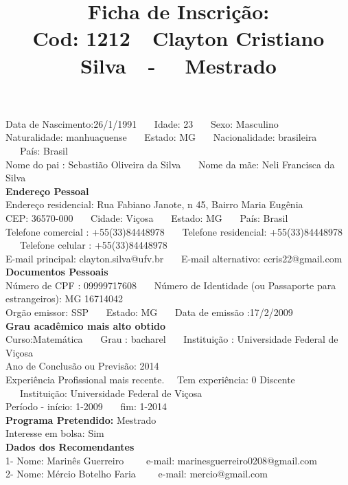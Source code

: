 \documentclass[11pt]{article}
\title{\vspace*{-4cm} Ficha de Inscrição: \\Cod: 1212\ \ Clayton Cristiano Silva\ \ - \ \ Mestrado 
 }
\date{}
\begin{document}
\maketitle
\vspace*{-1.5cm}
\noindent Data de Nascimento:26/1/1991
\ \ \ Idade: 23   \ \ \ Sexo: Masculino
\\
Naturalidade: manhuaçuense  
\ \ \  Estado: MG
\ \ \  Nacionalidade: brasileira
\ \ \ País: Brasil
\\        
Nome do pai : Sebastião Oliveira da Silva
\ \ \ Nome da mãe: Neli Francisca da Silva          
\\[0.2cm]                     
\textbf{Endereço Pessoal} 
\\ 
\noindent Endereço residencial: Rua Fabiano Janote, n 45, Bairro Maria Eugênia
\\
        CEP: 36570-000 
\ \ \ Cidade: Viçosa 
\ \ \ Estado: MG 
\ \ \ País: Brasil
\\		
		Telefone comercial : +55(33)84448978
\ \ \ Telefone residencial: +55(33)84448978
\ \ \ Telefone celular : +55(33)84448978
\\
E-mail principal: clayton.silva@ufv.br
\ \ \ E-mail alternativo: ccris22@gmail.com 
\\[0.2cm] 
\textbf{Documentos Pessoais}
\\
\noindent Número de CPF : 09999717608
\ \ \ Número de Identidade (ou Passaporte para estrangeiros): MG 16714042
\\
Orgão emissor: SSP
\ \ \ Estado: MG
\ \ \ Data de emissão :17/2/2009
\\[0.3cm]
\textbf{Grau acadêmico mais alto obtido}
\\	
Curso:Matemática
\ \ \ Grau : bacharel
\ \ \ Instituição : Universidade Federal de Viçosa
\\			
Ano de Conclusão ou Previsão: 2014
\\ 
Experiência Profissional mais recente. \ \  
Tem experiência: 0 Discente  
\ \ \ Instituição: Universidade Federal de Viçosa
\\  
Período - início: 1-2009
\ \ \ fim: 1-2014
\\[0.2cm] 
\textbf{Programa Pretendido:} Mestrado\\
Interesse em bolsa: Sim
\\[0.3cm]		
\textbf{Dados dos Recomendantes} 
\\
1- Nome: Marinês Guerreiro
\ \ \ \  e-mail: marinesguerreiro0208@gmail.com 
\\
2- Nome: Mércio Botelho Faria
\ \ \ \ e-mail: mercio@gmail.com
\end{document}
